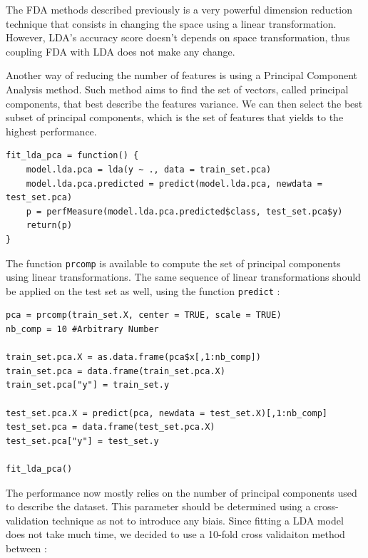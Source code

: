 \documentclass[]{report}
\begin{document}
The FDA methods described previously is a very powerful dimension reduction technique that consists in changing the space using a linear transformation. However, LDA's accuracy score doesn't depends on space transformation, thus coupling FDA with LDA does not make any change.

Another way of reducing the number of features is using a Principal Component Analysis method. Such method aims to find the set of vectors, called principal components, that best describe the features variance. We can then select the best subset of principal components, which is the set of features that yields to the highest performance.

\begin{lstlisting}
fit_lda_pca = function() {
	model.lda.pca = lda(y ~ ., data = train_set.pca)
	model.lda.pca.predicted = predict(model.lda.pca, newdata = test_set.pca)
	p = perfMeasure(model.lda.pca.predicted$class, test_set.pca$y)
	return(p)
}

\end{lstlisting}

The function \texttt{prcomp} is available to compute the set of principal components using linear transformations. The same sequence of linear transformations should be applied on the test set as well, using the function \texttt{predict} : 
\begin{lstlisting}
pca = prcomp(train_set.X, center = TRUE, scale = TRUE)
nb_comp = 10 #Arbitrary Number

train_set.pca.X = as.data.frame(pca$x[,1:nb_comp])
train_set.pca = data.frame(train_set.pca.X)
train_set.pca["y"] = train_set.y

test_set.pca.X = predict(pca, newdata = test_set.X)[,1:nb_comp]
test_set.pca = data.frame(test_set.pca.X)
test_set.pca["y"] = test_set.y

fit_lda_pca()
\end{lstlisting}

The performance now mostly relies on the number of principal components used to describe the dataset. This parameter should be determined using a cross-validation technique as not to introduce any biais. Since fitting a LDA model does not take much time, we decided to use a 10-fold cross validaiton method between : 
\end{document}
